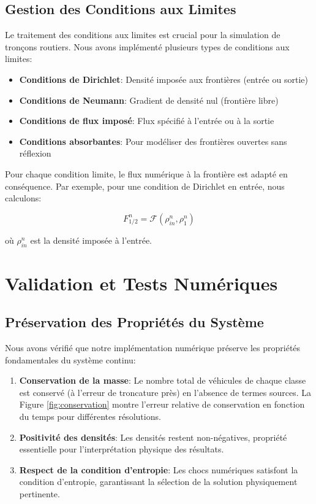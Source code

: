 \subsection{Gestion des Conditions aux Limites}
\label{subsec:conditions_limites}

Le traitement des conditions aux limites est crucial pour la simulation de tronçons routiers. Nous avons implémenté plusieurs types de conditions aux limites:

\begin{itemize}
\item \textbf{Conditions de Dirichlet}: Densité imposée aux frontières (entrée ou sortie)
\item \textbf{Conditions de Neumann}: Gradient de densité nul (frontière libre)
\item \textbf{Conditions de flux imposé}: Flux spécifié à l'entrée ou à la sortie
\item \textbf{Conditions absorbantes}: Pour modéliser des frontières ouvertes sans réflexion
\end{itemize}

Pour chaque condition limite, le flux numérique à la frontière est adapté en conséquence. Par exemple, pour une condition de Dirichlet en entrée, nous calculons:

\begin{equation}
F_{1/2}^n = \mathcal{F}(\rho_{in}^n, \rho_1^n)
\end{equation}

où $\rho_{in}^n$ est la densité imposée à l'entrée.

\section{Validation et Tests Numériques}
\label{sec:validation_tests}

\subsection{Préservation des Propriétés du Système}
\label{subsec:preservation_proprietes}

Nous avons vérifié que notre implémentation numérique préserve les propriétés fondamentales du système continu:

\begin{enumerate}
\item \textbf{Conservation de la masse}: Le nombre total de véhicules de chaque classe est conservé (à l'erreur de troncature près) en l'absence de termes sources. La Figure \ref{fig:conservation} montre l'erreur relative de conservation en fonction du temps pour différentes résolutions.

\item \textbf{Positivité des densités}: Les densités restent non-négatives, propriété essentielle pour l'interprétation physique des résultats.

\item \textbf{Respect de la condition d'entropie}: Les chocs numériques satisfont la condition d'entropie, garantissant la sélection de la solution physiquement pertinente.
\end{enumerate}

